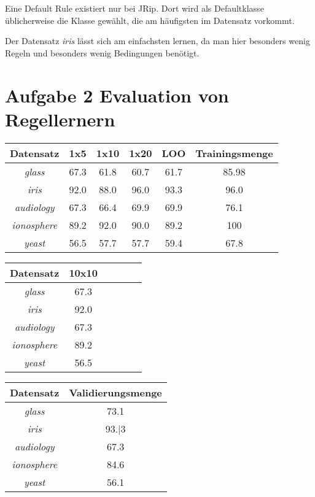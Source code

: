 Eine Default Rule existiert nur bei JRip. Dort wird als Defaultklasse \"ublicherweise die Klasse gew\"ahlt, die am h\"aufigsten im Datensatz vorkommt. 

Der Datensatz \emph{iris} l\"asst sich am einfachsten lernen, da man hier besonders wenig Regeln und besonders wenig Bedingungen ben\"otigt.



\section{Aufgabe 2 Evaluation von Regellernern} %
\label{sec:aufgabe_2_evaluation_von_regellernern}

\begin{tabular}{c|c|c|c|c|c}
				Datensatz         & 1x5  & 1x10 & 1x20 & LOO  & Trainingsmenge   \\ \hline
				\emph{glass}      & 67.3 & 61.8 & 60.7 & 61.7 & 85.98   \\ \hline
				\emph{iris}       & 92.0 & 88.0 & 96.0 & 93.3 & 96.0    \\ \hline
				\emph{audiology}  & 67.3 & 66.4 & 69.9 & 69.9 & 76.1    \\ \hline
				\emph{ionosphere} & 89.2 & 92.0 & 90.0 & 89.2 & 100   \\ \hline
				\emph{yeast}      & 56.5 & 57.7 & 57.7 & 59.4 & 67.8   \\ \hline
\end{tabular}

\begin{tabular}{c|c|c|c|c|c}
				Datensatz         & 10x10    \\ \hline
				\emph{glass}      & 67.3     \\ \hline
				\emph{iris}       & 92.0     \\ \hline
				\emph{audiology}  & 67.3     \\ \hline
				\emph{ionosphere} & 89.2     \\ \hline
				\emph{yeast}      & 56.5     \\ \hline
\end{tabular}


\begin{tabular}{c|c}
				Datensatz         & Validierungsmenge    \\ \hline
				\emph{glass}      & 73.1     \\ \hline
				\emph{iris}       & 93.\bar3     \\ \hline
				\emph{audiology}  & 67.3   \\ \hline
				\emph{ionosphere} & 84.6   \\ \hline
				\emph{yeast}      & 56.1 \\ \hline
\end{tabular}




